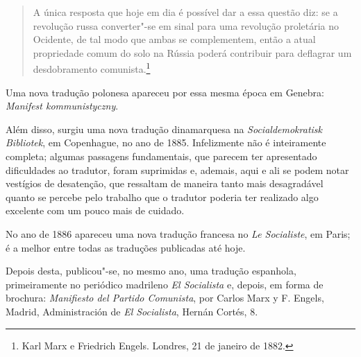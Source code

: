 \begin{quote}

 A única resposta que hoje em dia é possível dar a essa questão diz: se
a revolução russa converter"-se em sinal para uma revolução proletária
no Ocidente, de tal modo que ambas se complementem, então a atual
propriedade comum do solo na Rússia poderá contribuir para deflagrar um
desdobramento comunista.\footnote{Karl Marx e Friedrich Engels. Londres, 21 de janeiro de 1882.}
\end{quote} 

 Uma nova tradução polonesa apareceu por essa mesma época em Genebra:
\textit{Manifest kommunistyczny}.

 Além disso, surgiu uma nova tradução dinamarquesa na
\textit{Socialdemokratisk Bibliotek}, em Copenhague, no ano de 1885.
Infelizmente não é inteiramente completa; algumas passagens
fundamentais, que parecem ter apresentado dificuldades ao tradutor,
foram suprimidas e, ademais, aqui e ali se podem notar vestígios de
desatenção, que ressaltam de maneira tanto mais desagradável quanto se
percebe pelo trabalho que o tradutor poderia ter realizado algo
excelente com um pouco mais de cuidado.

 No ano de 1886 apareceu uma nova tradução francesa no \textit{Le
Socialiste}, em Paris; é a melhor entre todas as traduções publicadas
até hoje.

 Depois desta, publicou"-se, no mesmo ano, uma tradução espanhola,
primeiramente no periódico madrileno \textit{El Socialista} e, depois,
em forma de brochura: \textit{Manifiesto del Partido Comunista}, por
Carlos Marx y F. Engels, Madrid, Administración de \textit{El Socialista},
Hernán Cortés, 8.

